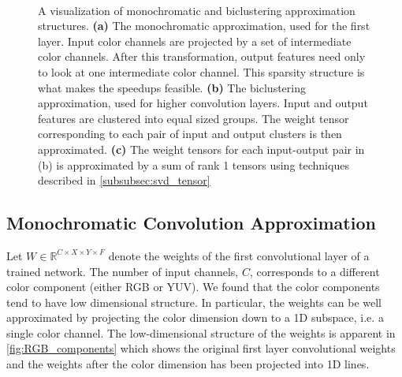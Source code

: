 \begin{figure}[ht]
\centering
\mbox{
\hspace{1mm}
\hspace{1mm}
}
\vspace{-3mm}
\caption{ A visualization of monochromatic and biclustering approximation structures. {\bf (a)} The monochromatic approximation, used for the first layer. Input color channels are projected by a set of intermediate color channels. After this transformation, output features need only to look at one intermediate color channel. This sparsity structure is what makes the speedups feasible. {\bf (b)} The biclustering approximation, used for higher convolution layers. Input and output features are clustered into equal sized groups. The weight tensor corresponding to each pair of input and output clusters is then approximated. {\bf (c)} The weight tensors for each input-output pair in (b) is approximated by a sum of rank 1 tensors using techniques described in \ref{subsubsec:svd_tensor}}
\end{figure}

\subsection{Monochromatic Convolution Approximation}\label{subsec:monochromatic}
Let $W \in \mathbb{R}^{C \times X \times Y \times F}$ denote the
weights of the first convolutional layer of a trained network.  The
number of input channels, $C$, corresponds to a different color
component (either RGB or YUV).  
We found that the color components
tend to have low dimensional structure. In
particular, the weights can be well approximated by projecting the
color dimension down to a 1D subspace, i.e. a single color
channel. The low-dimensional structure of the weights is apparent in
\ref{fig:RGB_components} which shows the original first layer convolutional weights
and the weights after the color dimension has
been projected into 1D lines.

